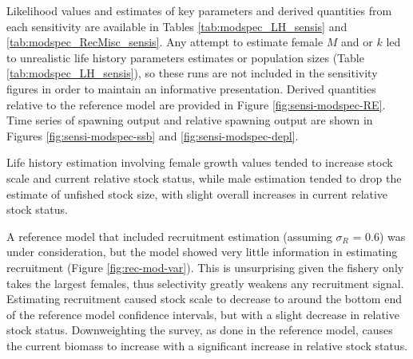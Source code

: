 \documentclass[11pt,
  english,
  a4paper,
]{article}
\begin{document}
\tagstructend


Likelihood values and estimates of key parameters and derived quantities from each sensitivity are available in Tables \ref{tab:modspec_LH_sensis} and \ref{tab:modspec_RecMisc_sensis}. Any attempt to estimate female {\(M\)\leavevmode\tagmcend\tagstructend} and or {\(k\)\leavevmode\tagmcend\tagstructend} led to unrealistic life history parameters estimates or population sizes (Table \ref{tab:modspec_LH_sensis}), so these runs are not included in the sensitivity figures in order to maintain an informative presentation. Derived quantities relative to the reference model are provided in Figure \ref{fig:sensi-modspec-RE}. Time series of spawning output and relative spawning output are shown in Figures \ref{fig:sensi-modspec-ssb} and \ref{fig:sensi-modspec-depl}.

\leavevmode\tagmcend\tagstructend\par


Life history estimation involving female growth values tended to increase stock scale and current relative stock status, while male estimation tended to drop the estimate of unfished stock size, with slight overall increases in current relative stock status.

\leavevmode\tagmcend\tagstructend\par


A reference model that included recruitment estimation (assuming {\(\sigma_R\)\leavevmode\tagmcend\tagstructend} = 0.6) was under consideration, but the model showed very little information in estimating recruitment (Figure \ref{fig:rec-mod-var}). This is unsurprising given the fishery only takes the largest females, thus selectivity greatly weakens any recruitment signal. Estimating recruitment caused stock scale to decrease to around the bottom end of the reference model confidence intervals, but with a slight decrease in relative stock status. Downweighting the survey, as done in the reference model, causes the current biomass to increase with a significant increase in relative stock status.

\leavevmode\tagmcend\tagstructend\par
\end{document}
